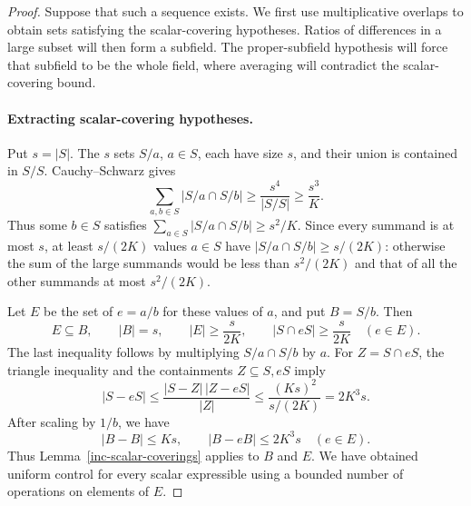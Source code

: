\begin{proof}
Suppose that such a sequence exists. We first use multiplicative
overlaps to obtain sets satisfying the scalar-covering hypotheses.
Ratios of differences in a large subset will then form a subfield.
The proper-subfield hypothesis will force that subfield to be the
whole field, where averaging will contradict the scalar-covering
bound.

\paragraph{Extracting scalar-covering hypotheses.}
Put $s=|S|$. The $s$ sets
$S/a$, $a\in S$, each have size $s$, and their union is contained
in $S/S$. Cauchy--Schwarz gives
\begin{equation}\label{eq:inc-multiplicative-overlaps}
 \sum_{a,b\in S}|S/a\cap S/b|
 \ge\frac{s^4}{|S/S|}\ge\frac{s^3}{K}.
\end{equation}
Thus some $b\in S$ satisfies
$\sum_{a\in S}|S/a\cap S/b|\ge s^2/K$.
Since every summand is at most $s$, at least $s/(2K)$ values
$a\in S$ have $|S/a\cap S/b|\ge s/(2K)$: otherwise the sum of
the large summands would be less than $s^2/(2K)$ and that of all
the other summands at most $s^2/(2K)$.

Let $E$ be the set of $e=a/b$ for these values of $a$, and put
$B=S/b$. Then
\begin{equation}\label{eq:inc-overlap-subset}
 E\subseteq B,\qquad |B|=s,\qquad
 |E|\ge\frac{s}{2K},\qquad
 |S\cap eS|\ge\frac{s}{2K}\quad(e\in E).
\end{equation}
The last inequality follows by multiplying $S/a\cap S/b$ by $a$.
For $Z=S\cap eS$, the triangle inequality and the containments
$Z\subseteq S,eS$ imply
\[
 |S-eS|
 \le\frac{|S-Z|\,|Z-eS|}{|Z|}
 \le\frac{(Ks)^2}{s/(2K)}=2K^3s.
\]
After scaling by $1/b$, we have
\[
 |B-B|\le Ks,\qquad |B-eB|\le2K^3s\quad(e\in E).
\]
Thus Lemma~\ref{inc-scalar-coverings} applies to $B$ and $E$.
We have obtained uniform control for every scalar expressible using
a bounded number of operations on elements of $E$.


\end{proof}
